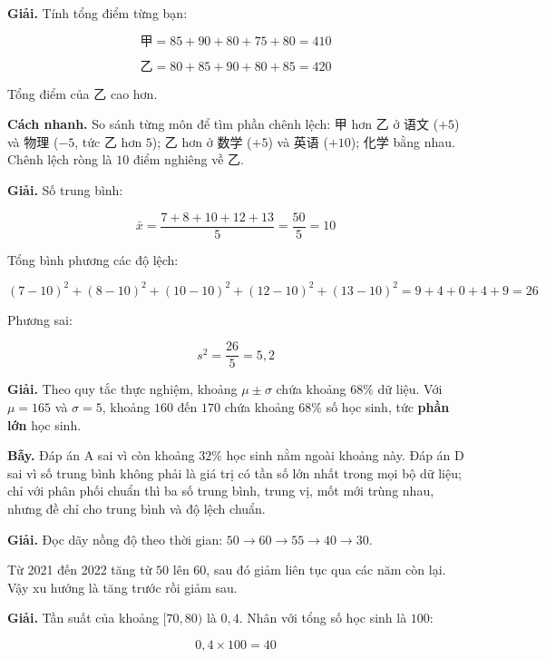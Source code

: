 \documentclass[11pt, a4paper]{article}
\begin{document}
\begin{dapan}[5 — Đáp án B]
\textbf{Giải.} Tính tổng điểm từng bạn:

$$\text{甲} = 85 + 90 + 80 + 75 + 80 = 410$$

$$\text{乙} = 80 + 85 + 90 + 80 + 85 = 420$$

Tổng điểm của 乙 cao hơn.

\textbf{Cách nhanh.} So sánh từng môn để tìm phần chênh lệch: 甲 hơn 乙 ở 语文 ($+5$) và 物理 ($-5$, tức 乙 hơn $5$); 乙 hơn ở 数学 ($+5$) và 英语 ($+10$); 化学 bằng nhau. Chênh lệch ròng là $10$ điểm nghiêng về 乙.
\end{dapan}

\begin{dapan}[6 — Đáp án B]
\textbf{Giải.} Số trung bình:

$$\bar{x} = \frac{7 + 8 + 10 + 12 + 13}{5} = \frac{50}{5} = 10$$

Tổng bình phương các độ lệch:

$$(7-10)^2 + (8-10)^2 + (10-10)^2 + (12-10)^2 + (13-10)^2 = 9 + 4 + 0 + 4 + 9 = 26$$

Phương sai:

$$s^2 = \frac{26}{5} = 5{,}2$$
\end{dapan}

\begin{dapan}[7 — Đáp án B]
\textbf{Giải.} Theo quy tắc thực nghiệm, khoảng $\mu \pm \sigma$ chứa khoảng $68\%$ dữ liệu. Với $\mu = 165$ và $\sigma = 5$, khoảng $160$ đến $170$ chứa khoảng $68\%$ số học sinh, tức \textbf{phần lớn} học sinh.

\textbf{Bẫy.} Đáp án A sai vì còn khoảng $32\%$ học sinh nằm ngoài khoảng này. Đáp án D sai vì số trung bình không phải là giá trị có tần số lớn nhất trong mọi bộ dữ liệu; chỉ với phân phối chuẩn thì ba số trung bình, trung vị, mốt mới trùng nhau, nhưng đề chỉ cho trung bình và độ lệch chuẩn.
\end{dapan}

\begin{dapan}[8 — Đáp án C]
\textbf{Giải.} Đọc dãy nồng độ theo thời gian: $50 \to 60 \to 55 \to 40 \to 30$.

Từ 2021 đến 2022 tăng từ $50$ lên $60$, sau đó giảm liên tục qua các năm còn lại. Vậy xu hướng là tăng trước rồi giảm sau.
\end{dapan}

\begin{dapan}[9 — Đáp án C]
\textbf{Giải.} Tần suất của khoảng $[70, 80)$ là $0{,}4$. Nhân với tổng số học sinh là $100$:

$$0{,}4 \times 100 = 40$$
\end{dapan}
\end{document}

